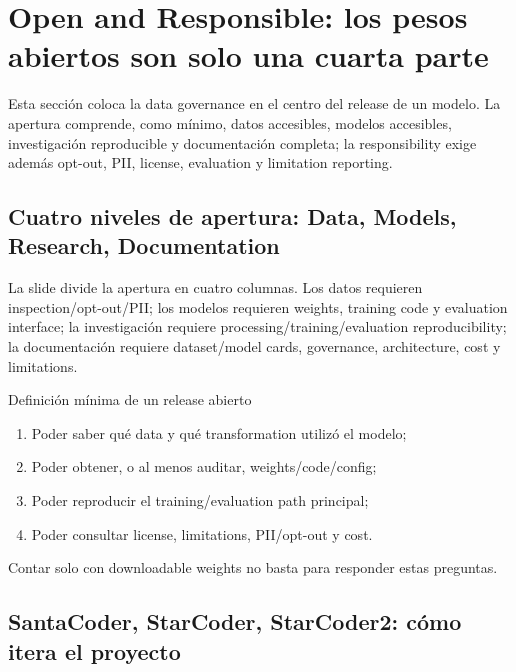 \section{Open and Responsible: los pesos abiertos son solo una cuarta parte}

Esta sección coloca la data governance en el centro del release de un modelo. La apertura comprende, como mínimo, datos accesibles, modelos accesibles, investigación reproducible y documentación completa; la responsibility exige además opt-out, PII, license, evaluation y limitation reporting.

\subsection{Cuatro niveles de apertura: Data, Models, Research, Documentation}

La slide divide la apertura en cuatro columnas. Los datos requieren inspection/opt-out/PII; los modelos requieren weights, training code y evaluation interface; la investigación requiere processing/training/evaluation reproducibility; la documentación requiere dataset/model cards, governance, architecture, cost y limitations.


\begin{importantbox}{Definición mínima de un release abierto}
\begin{enumerate}
  \item Poder saber qué data y qué transformation utilizó el modelo;
  \item Poder obtener, o al menos auditar, weights/code/config;
  \item Poder reproducir el training/evaluation path principal;
  \item Poder consultar license, limitations, PII/opt-out y cost.
\end{enumerate}
Contar solo con downloadable weights no basta para responder estas preguntas.
\end{importantbox}


\subsection{SantaCoder, StarCoder, StarCoder2: cómo itera el proyecto}

